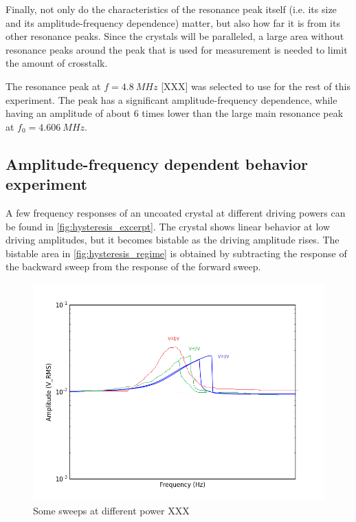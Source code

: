 Finally, not only do the characteristics of the resonance peak itself (i.e. its size and its amplitude-frequency dependence) matter, but also how far it is from its other resonance peaks. Since the crystals will be paralleled, a large area without resonance peaks around the peak that is used for measurement is needed to limit the amount of crosstalk. 

The resonance peak at $f = \SI{4.8}{MHz}$ [XXX] was selected to use for the rest of this experiment. The peak has a significant amplitude-frequency dependence, while having an amplitude of about 6 times lower than the large main resonance peak at $f_0 = \SI{4.606}{MHz}$. 

\subsection{Amplitude-frequency dependent behavior experiment}

A few frequency responses of an uncoated crystal at different driving powers can be found in \autoref{fig:hysteresis_excerpt}. The crystal shows linear behavior at low driving amplitudes, but it becomes bistable as the driving amplitude rises. The bistable area in \autoref{fig:hysteresis_regime} is obtained by subtracting the response of the backward sweep from the response of the forward sweep. 

\begin{figure}
	\centering
		\includegraphics[width=\textwidth]{figures/hysteresis_excerpt.png}
	\caption{Some sweeps at different power XXX}
	\label{fig:hysteresis_excerpt}
\end{figure}

